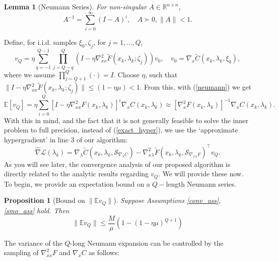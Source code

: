 \documentclass[11pt, twoside]{report}
\newtheorem{proposition}[theorem]{Proposition}
\newtheorem{lemma}[theorem]{Lemma}
\begin{document}
\begin{lemma}[Neumann Series] \label{neumannlem}
For non-singular $A \in \mathbb{R}^{n \times n}$,
\begin{equation} \label{neumann} 
    A^{-1} = \sum^{\infty}_{i=0} (I-A)^i, \quad A \succ 0, \|A\| < 1.
\end{equation}
\end{lemma}
Define, for i.i.d. samples $\xi_0, \zeta_j$, for $j=1,\hdots,Q$,
\begin{equation} \label{HIA_stocBio}
    v_Q= \eta \sum_{q=-1}^{Q-1} \prod_{j=Q-q}^Q\left(I- \eta \nabla_{xx}^2 \tilde{F}\left(x_k, \lambda_k ; \zeta_j\right)\right) v_0, \quad v_0 = \nabla_x \tilde{C}(x_k,\lambda_k,\xi_0),
\end{equation}
where we assume $\prod_{j=Q+1}^Q (\cdot) = I$. Choose $\eta$, such that $\|I- \eta \nabla_{xx}^2 \tilde{F}\left(x_k, \lambda_k ; \zeta_j\right)\| \leq (1-\eta\mu) < 1$. From this, with (\ref{neumann}) we get
\[\mathbb{E}[v_Q] = \eta \sum_{i=0}^{Q} \left[I - \eta\nabla_{xx}^2 F \left(x_k, \lambda_k\right)\right]^i\nabla_x C(x_k,\lambda_k) \approx \left[\nabla_x^2 F\left(x_k, \lambda_k\right)\right]^{-1} \nabla_x C\left(x_k, \lambda_k\right).\]
With this in mind, and the fact that it is not generally feasible to solve the inner problem to full precision, instead of (\ref{exact_hyper}), we use the `approximate hypergradient' in line 3 of our algorithm:
\begin{equation} \label{hat_nabla_def}
                \widehat{\nabla}\mathcal{L}(\lambda_k) = \nabla_\lambda \tilde{C}(x_k,\lambda_k,\mathcal{S}_{\nabla_\lambda C}) - \nabla_{x \lambda}^2 \tilde{F}(x_k,\lambda_k,\mathcal{S}_{\nabla_{x\lambda} F})^\top v_Q.
            \end{equation}
As you will see later, the convergence analysis of our proposed algorithm is directly related to the analytic results regarding $v_Q$. We will provide these now. To begin, we  provide an expectation bound on a $Q-$length Neumann series.
\begin{proposition}[Bound on $\|\mathbb{E}v_Q\|$] \label{evq_bnd}
    Suppose Assumptions \ref{conv_ass}, \ref{smo_ass} hold. Then 
    \[\|\mathbb{E}v_Q\| \leq \frac{M}{\mu}(1-(1-\eta\mu)^{Q+1})\]
\end{proposition}
The variance of the $Q$-long Neumann expansion can be controlled by the sampling of $\nabla_{xx}^2 F$ and $\nabla_x C$ as follows:
\end{document}
